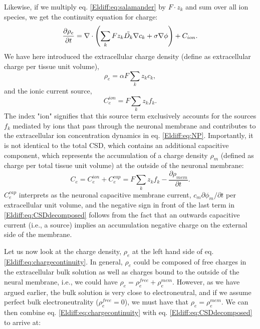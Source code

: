 Likewise, if we multiply eq. \ref{Eldiff:eq:salamander} by $F\cdot z_k$ and sum over all ion species, we get the continuity equation for charge: 
\begin{equation}
\frac{\partial \rho_e}{\partial t} =  \nabla \cdot \left (\sum_k{F z_k \tilde{D_k}{\bf \nabla} c_{k}} + \sigma\nabla\phi  \right)  + C_{ion}.
\label{Eldiff:eq:chargecontinuity}
\end{equation}
We have here introduced the extracellular charge density (define as extracellular charge per tissue unit volume), 
\begin{equation}
\rho_e = \alpha F \sum_k z_k c_k,  
\label{Eldiff:eq:roen}
\end{equation}
and the ionic current source, 
\begin{equation}
C_e^{ion} = F \sum_k z_k f_k. 
\label{Eldiff:eq:csden}
\end{equation}
The index "ion" signifies that this source term exclusively accounts for the sources $f_k$ mediated by ions that pass through the neuronal membrane and contributes to the extracellular ion concentration dynamics in eq. \ref{Eldiff:eq:NP}. Importantly, it is not identical to the total CSD, which contains an additional capacitive component, which represents the accumulation of a charge density $\rho_m$ (defined as charge per total tissue unit volume) at the outside of the neuronal membrane:
\begin{equation}
C_e = C_e^{ion} + C_e^{cap} = F \sum_k z_k f_k - \frac{\partial \rho_{mem}}{\partial t}.
\label{Eldiff:eq:CSDdecomposed}
\end{equation}
$C_e^{cap}$ interprets as the neuronal capacitive membrane current, $c_m \partial \phi_m/\partial t$ per extracellular unit volume, and the negative sign in front of the last term in \ref{Eldiff:eq:CSDdecomposed} follows from the fact that an outwards capacitive current (i.e., a source) implies an accumulation negative charge on the external side of the membrane. 

Let us now look at the charge density, $\rho_e$ at the left hand side of eq. \ref{Eldiff:eq:chargecontinuity}. In general, $\rho_e$ could be composed of free charges in the extracellular bulk solution as well as charges bound to the outside of the neural membrane, i.e., we could have $\rho_e = \rho_e^{free} + \rho_e^{mem}$. However, as we have argued earlier, the bulk solution is very close to electroneutral, and if we assume perfect bulk electroneutrality ($\rho_e^{free} = 0$), we must have that $\rho_e=\rho_e^{mem}$. We can then combine eq. \ref{Eldiff:eq:chargecontinuity}  with eq. \ref{Eldiff:eq:CSDdecomposed} to arrive at:


